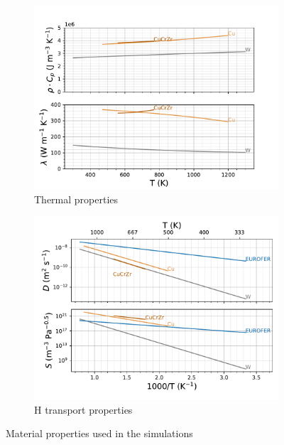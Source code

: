 \begin{figure}
    \centering
    \begin{subfigure}{\linewidth}
        \centering
        \includegraphics[width=\linewidth]{Figures/Chapter3/monoblocks/interface_condition/iter case/thermal_prop.pdf}
        \caption{Thermal properties}
    \end{subfigure}
    \begin{subfigure}{\linewidth}
        \centering
        \includegraphics[width=\linewidth]{Figures/Chapter3/monoblocks/interface_condition/H_properties.pdf}
        \caption{H transport properties}
    \end{subfigure}
    \caption{Material properties used in the simulations \cite{frauenfelder_solution_1969, reiter_compilation_1996, serra_hydrogen_1998, aiello_hydrogen_2002}}
    \label{fig:properties_1}
\end{figure}

